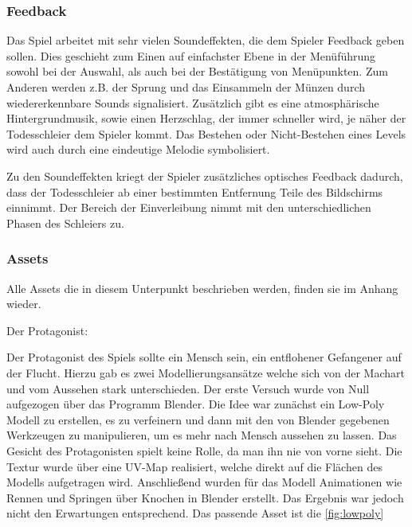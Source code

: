 \documentclass[10pt]{article}
\begin{document}
\vspace{0.5cm}
\subsubsection{Feedback}

Das Spiel arbeitet mit sehr vielen Soundeffekten, die dem Spieler Feedback geben sollen. Dies geschieht zum Einen auf einfachster Ebene in der Menüführung sowohl bei der Auswahl, als auch bei der  Bestätigung von Menüpunkten. Zum Anderen werden z.B. der Sprung und das Einsammeln der Münzen durch wiedererkennbare Sounds signalisiert.
Zusätzlich gibt es eine atmosphärische Hintergrundmusik, sowie einen Herzschlag, der immer schneller wird, je näher der Todesschleier dem Spieler kommt. Das Bestehen oder Nicht-Bestehen eines Levels wird auch durch eine eindeutige Melodie symbolisiert. \newline

\noindent Zu den Soundeffekten kriegt der Spieler zusätzliches optisches Feedback dadurch, dass der Todesschleier ab einer bestimmten Entfernung Teile des Bildschirms einnimmt. Der Bereich der Einverleibung nimmt mit den unterschiedlichen Phasen des Schleiers zu. 

\newpage
\vspace{0.5cm}
\subsubsection{Assets}

\begin{scriptsize} Alle Assets die in diesem Unterpunkt beschrieben werden, finden sie im Anhang wieder.\end{scriptsize}\newline

\noindent Der Protagonist:\newline

\noindent Der Protagonist des Spiels sollte ein Mensch sein, ein entflohener Gefangener auf der Flucht. 
Hierzu gab es zwei Modellierungsansätze welche sich von der Machart und vom Aussehen stark unterschieden. 
Der erste Versuch wurde von Null aufgezogen über das Programm Blender. Die Idee war zunächst ein Low-Poly Modell zu erstellen, es zu verfeinern
und dann mit den von Blender gegebenen Werkzeugen zu manipulieren, um es mehr nach Mensch aussehen zu lassen. Das Gesicht des Protagonisten spielt keine Rolle,
da man ihn nie von vorne sieht. Die Textur wurde über eine UV-Map realisiert, welche direkt auf die Flächen des Modells aufgetragen wird. 
Anschließend wurden für das Modell Animationen wie Rennen und Springen über Knochen in Blender erstellt. Das Ergebnis war jedoch nicht den Erwartungen entsprechend.
Das passende Asset ist die \ref{fig:lowpoly}\newline
\end{document}
